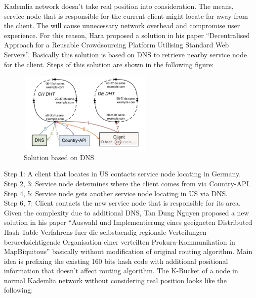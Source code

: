 \documentclass[12pt,oneside,a4paper]{article}
\begin{document}
Kademlia network doesn't take real position into consideration. The means, service node that is responsible for the current client might locate far away from the client. The will cause unnecessary network overhead and compromise user experience. For this reason, Hara proposed a solution in his paper ``Decentralised Approach for a Reusable Crowdsourcing Platform Utilising Standard Web Servers''. Basically this solution is based on DNS to retrieve nearby service node for the client. Steps of this solution are shown in the following figure:\\
\begin{figure}[htb]
\centering
\includegraphics[width=250px, height=150px]{sanedns.png}
\caption{Solution based on DNS}
\label{picture-label002}
\end{figure}
Step 1: A client that locates in US contacts service node locating in Germany.\\
Step 2, 3: Service node determines where the client comes from via Country-API.\\
Step 4, 5: Service node gets another service node locating in US via DNS.\\
Step 6, 7: Client contacts the new service node that is responsible for its area.\\

Given the complexity due to additional DNS, Tan Dung Nguyen proposed a new solution in his paper ``Auswahl und Implementierung eines geeigneten Distributed Hash Table Verfahrens fuer die selbstaendig regionale Verteilungen beruecksichtigende Organisation einer verteilten Prokura-Kommunikation in MapBiquitous'' basically without modification of original routing algorithm. Main idea is prefixing the existing 160 bits hash code with additional positional information that doesn't affect routing algorithm. The K-Bucket of a node in normal Kademlia network without considering real position looks like the following:
\end{document}
